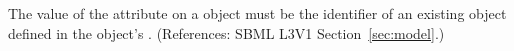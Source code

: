 The value of the attribute  on a \Model object must
be the identifier of an existing \Parameter object defined in the \Model
object's \ListOfParameters.  (References: SBML L3V1
Section~\ref{sec:model}.)
